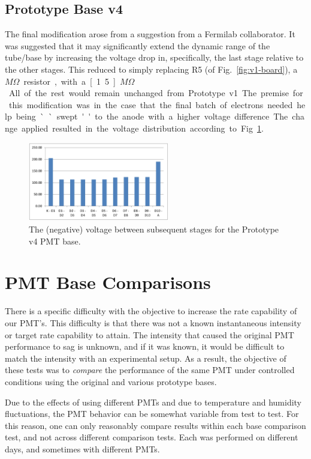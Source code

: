 \subsection{Prototype Base v4}

The final modification arose from a suggestion from a Fermilab collaborator. It was suggested that it may significantly extend the dynamic range of the tube/base by increasing the voltage drop in, specifically, the last stage relative to the other stages.  This reduced to simply replacing R5 (of Fig.~\ref{fig:v1-board}), a \unit[1]{$M\Omega$} resistor, with a \unit[1.5]{$M\Omega$}.  All of the rest would remain unchanged from Prototype v1. The premise for this modification was in the case that the final batch of electrons needed help being ``swept'' to the anode with a higher voltage difference. The change applied resulted in the voltage distribution according to Fig.~\ref{fig:v4-volt}.

\begin{figure}
	\centerline{
		\mbox{\includegraphics[width=0.55\textwidth]{figures/pmtupgrade/v4-volt.jpg}}
	}
	\caption{The (negative) voltage between subsequent stages for the Prototype v4 PMT base.}
	\label{fig:v4-volt}
\end{figure}

\section{PMT Base Comparisons}

There is a specific difficulty with the objective to increase the rate capability of our PMT's. This difficulty is that there was not a known instantaneous intensity or target rate capability to attain. The intensity that caused the original PMT performance to sag is unknown, and if it was known, it would be difficult to match the intensity with an experimental setup. As a result, the objective of these tests was to \emph{compare} the performance of the same PMT under controlled conditions using the original and various prototype bases.

Due to the effects of using different PMTs and due to temperature and humidity fluctuations, the PMT behavior can be somewhat variable from test to test. For this reason, one can only reasonably compare results within each base comparison test, and not across different comparison tests. Each was performed on different days, and sometimes with different PMTs.

